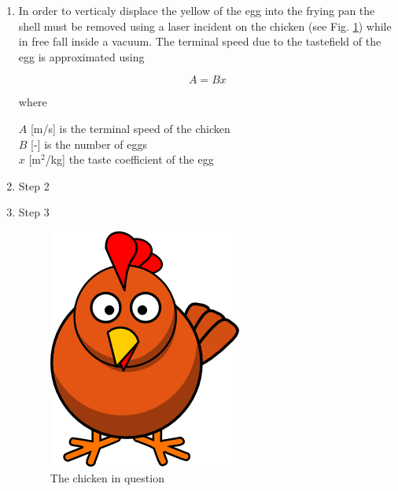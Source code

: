 \begin{enumerate}
\item In order to verticaly displace the yellow of the egg into the frying pan the shell must be removed using a laser incident on the chicken (see Fig. \ref{fig:chicken}) while in free fall inside a vacuum. The terminal speed due to the tastefield of the egg is approximated using 

\begin{equation}
A=Bx
\end{equation}


where 

$A$ \hspace{1cm} [m/s] is the terminal speed of the chicken \\
$B$ \hspace{1cm} [-] is the number of eggs \\
$x$ \hspace{1cm} [m$^2$/kg] the taste coefficient of the egg \\


\item Step 2

\item Step 3


\begin{figure}
\centering
\includegraphics{figures/chicken}
\caption{The chicken in question}
\label{fig:chicken}
\end{figure}


\end{enumerate}




